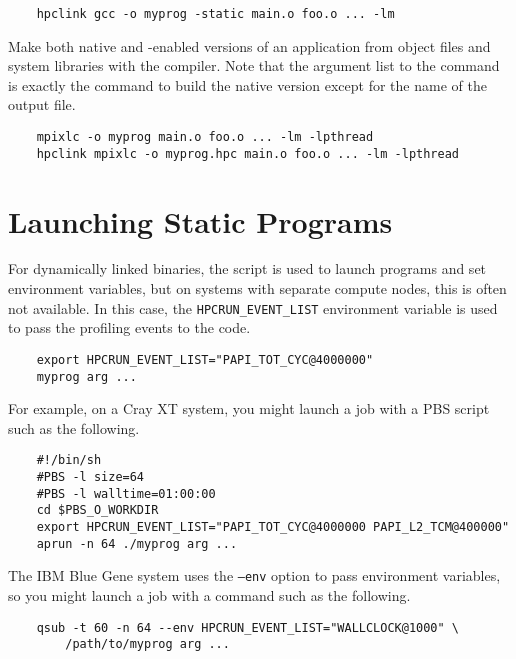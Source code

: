 \documentclass[english]{article}
\begin{document}
\begin{verbatim}
    hpclink gcc -o myprog -static main.o foo.o ... -lm
\end{verbatim}
%
Make both native and -enabled versions of an application from object files and system libraries with the  compiler.
Note that the argument list to the  command is exactly the command to build the native version except for the name of the output file.

\begin{verbatim}
    mpixlc -o myprog main.o foo.o ... -lm -lpthread
    hpclink mpixlc -o myprog.hpc main.o foo.o ... -lm -lpthread
\end{verbatim}


\section{Launching Static Programs}

For dynamically linked binaries, the  script is used to launch programs and set environment variables, but on systems with separate compute nodes, this is often not available.
In this case, the \texttt{HPCRUN\_EVENT\_LIST} environment variable is used to pass the profiling events to the  code.

\begin{verbatim}
    export HPCRUN_EVENT_LIST="PAPI_TOT_CYC@4000000"
    myprog arg ...
\end{verbatim}
%
For example, on a Cray XT system, you might launch a job with a PBS
script such as the following.

\begin{verbatim}
    #!/bin/sh
    #PBS -l size=64
    #PBS -l walltime=01:00:00
    cd $PBS_O_WORKDIR
    export HPCRUN_EVENT_LIST="PAPI_TOT_CYC@4000000 PAPI_L2_TCM@400000"
    aprun -n 64 ./myprog arg ...
\end{verbatim}
%
The IBM Blue Gene system uses the \texttt{--env} option to pass
environment variables, so you might launch a job with a command
such as the following.

\begin{verbatim}
    qsub -t 60 -n 64 --env HPCRUN_EVENT_LIST="WALLCLOCK@1000" \
        /path/to/myprog arg ...
\end{verbatim}


\end{document}
